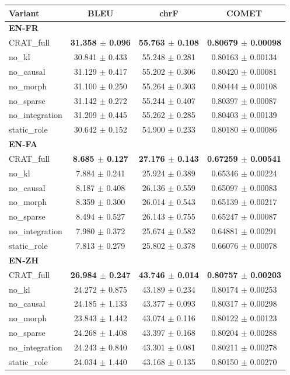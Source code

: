 \begingroup
\fontsize{7}{8.4}\selectfont
\setlength{\tabcolsep}{3pt}
\begin{tabular}{lccc}
\toprule
\textbf{Variant} & \textbf{BLEU} & \textbf{chrF} & \textbf{COMET} \\
\midrule
\multicolumn{4}{l}{\textbf{EN-FR}} \\
CRAT\_full & \textbf{31.358 $\pm$ 0.096} & \textbf{55.763 $\pm$ 0.108} & \textbf{0.80679 $\pm$ 0.00098} \\
no\_kl & 30.841 $\pm$ 0.433 & 55.248 $\pm$ 0.281 & 0.80163 $\pm$ 0.00134 \\
no\_causal & 31.129 $\pm$ 0.417 & 55.202 $\pm$ 0.306 & 0.80420 $\pm$ 0.00081 \\
no\_morph & 31.100 $\pm$ 0.250 & 55.264 $\pm$ 0.303 & 0.80444 $\pm$ 0.00108 \\
no\_sparse & 31.142 $\pm$ 0.272 & 55.244 $\pm$ 0.407 & 0.80397 $\pm$ 0.00087 \\
no\_integration & 31.209 $\pm$ 0.445 & 55.262 $\pm$ 0.285 & 0.80403 $\pm$ 0.00139 \\
static\_role & 30.642 $\pm$ 0.152 & 54.900 $\pm$ 0.233 & 0.80180 $\pm$ 0.00086 \\
\multicolumn{4}{l}{\textbf{EN-FA}} \\
CRAT\_full & \textbf{8.685 $\pm$ 0.127} & \textbf{27.176 $\pm$ 0.143} & \textbf{0.67259 $\pm$ 0.00541} \\
no\_kl & 7.884 $\pm$ 0.241 & 25.924 $\pm$ 0.389 & 0.65346 $\pm$ 0.00224 \\
no\_causal & 8.187 $\pm$ 0.408 & 26.136 $\pm$ 0.559 & 0.65097 $\pm$ 0.00083 \\
no\_morph & 8.359 $\pm$ 0.300 & 26.014 $\pm$ 0.543 & 0.65139 $\pm$ 0.00217 \\
no\_sparse & 8.494 $\pm$ 0.527 & 26.143 $\pm$ 0.755 & 0.65247 $\pm$ 0.00087 \\
no\_integration & 7.980 $\pm$ 0.372 & 25.674 $\pm$ 0.582 & 0.64881 $\pm$ 0.00291 \\
static\_role & 7.813 $\pm$ 0.279 & 25.802 $\pm$ 0.378 & 0.66076 $\pm$ 0.00078 \\
\multicolumn{4}{l}{\textbf{EN-ZH}} \\
CRAT\_full & \textbf{26.984 $\pm$ 0.247} & \textbf{43.746 $\pm$ 0.014} & \textbf{0.80757 $\pm$ 0.00203} \\
no\_kl & 24.272 $\pm$ 0.875 & 43.189 $\pm$ 0.234 & 0.80174 $\pm$ 0.00253 \\
no\_causal & 24.185 $\pm$ 1.133 & 43.377 $\pm$ 0.093 & 0.80317 $\pm$ 0.00298 \\
no\_morph & 23.843 $\pm$ 1.442 & 43.074 $\pm$ 0.116 & 0.80122 $\pm$ 0.00123 \\
no\_sparse & 24.268 $\pm$ 1.408 & 43.397 $\pm$ 0.168 & 0.80204 $\pm$ 0.00288 \\
no\_integration & 24.243 $\pm$ 0.840 & 43.301 $\pm$ 0.081 & 0.80211 $\pm$ 0.00278 \\
static\_role & 24.034 $\pm$ 1.440 & 43.168 $\pm$ 0.135 & 0.80150 $\pm$ 0.00270 \\
\bottomrule
\end{tabular}
\endgroup
